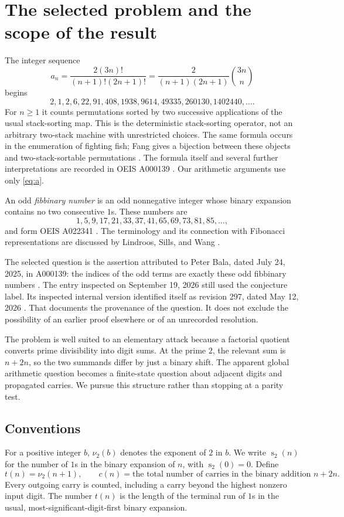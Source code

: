 \documentclass[11pt]{article}
\theoremstyle{definition}\newtheorem{definition}[theorem]{Definition}
\theoremstyle{remark}\newtheorem{remark}[theorem]{Remark}
\newcommand{\bit}{\operatorname{s}_2}
\begin{document}
\section{The selected problem and the scope of the result}\label{sec:setup}

The integer sequence
\begin{equation}\label{eq:a}
 a_n=\frac{2(3n)!}{(n+1)!(2n+1)!}
 =\frac{2}{(n+1)(2n+1)}\binom{3n}{n}
\end{equation}
begins
\[
 2,1,2,6,22,91,408,1938,9614,49335,260130,1402440,\ldots.
\]
For $n\geq1$ it counts permutations sorted by two successive applications
of the usual stack-sorting map. This is the deterministic stack-sorting
operator, not an arbitrary two-stack machine with unrestricted choices.
The same formula occurs in the enumeration of fighting fish; Fang gives a
bijection between these objects and two-stack-sortable permutations
\cite{Fang}. The formula itself and several further interpretations are
recorded in OEIS A000139 \cite{OEIS139}. Our arithmetic arguments use only
\eqref{eq:a}.

An odd \emph{fibbinary number} is an odd nonnegative integer whose binary
expansion contains no two consecutive $1$s. These numbers are
\[
 1,5,9,17,21,33,37,41,65,69,73,81,85,\ldots,
\]
and form OEIS A022341 \cite{OEIS22341}. The terminology and its connection
with Fibonacci representations are discussed by Lindroos, Sills, and Wang
\cite{LSW}.

The selected question is the assertion attributed to Peter Bala, dated
July 24, 2025, in A000139: the indices of the odd terms are exactly these
odd fibbinary numbers \cite{OEIS139}. The entry inspected on September 19,
2026 still used the conjecture label. Its inspected internal version
identified itself as revision 297, dated May 12, 2026 \cite{OEIS139internal}.
That documents the provenance of the question. It does not exclude the
possibility of an earlier proof elsewhere or of an unrecorded resolution.

The problem is well suited to an elementary attack because a factorial
quotient converts prime divisibility into digit sums. At the prime $2$,
the relevant sum is $n+2n$, so the two summands differ by just a binary
shift. The apparent global arithmetic question becomes a finite-state
question about adjacent digits and propagated carries. We pursue this
structure rather than stopping at a parity test.

\subsection{Conventions}
For a positive integer $b$, $\nu_2(b)$ denotes the exponent of $2$ in $b$.
We write $\bit(n)$ for the number of $1$s in the binary expansion of $n$,
with $\bit(0)=0$. Define
\[
 t(n)=\nu_2(n+1),\qquad
 c(n)=\text{the total number of carries in the binary addition }n+2n.
\]
Every outgoing carry is counted, including a carry beyond the highest
nonzero input digit. The number $t(n)$ is the length of the terminal run
of $1$s in the usual, most-significant-digit-first binary expansion.
\end{document}
